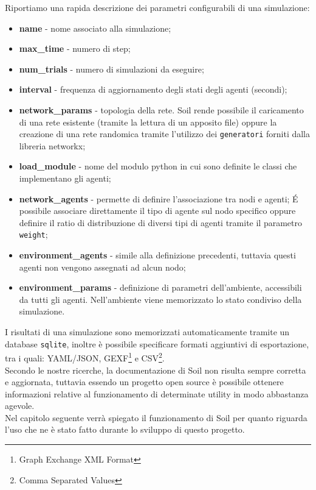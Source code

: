         Riportiamo una rapida descrizione dei parametri configurabili di una simulazione:
        
        \begin{itemize}
            \item \textbf{name} - nome associato alla simulazione;
            \item \textbf{max\_time} - numero di step;
            \item \textbf{num\_trials} - numero di simulazioni da eseguire;
            \item \textbf{interval} - frequenza di aggiornamento degli stati degli agenti (secondi);
            \item \textbf{network\_params} - topologia della rete. Soil rende possibile il caricamento di una rete esistente (tramite la lettura di un apposito file) oppure la creazione di una rete randomica tramite l'utilizzo dei \texttt{generatori} forniti dalla libreria networkx;
            \item \textbf{load\_module} - nome del modulo python in cui sono definite le classi che implementano gli agenti;
            \item \textbf{network\_agents} - permette di definire l'associazione tra nodi e agenti; \'E possibile associare direttamente il tipo di agente sul nodo specifico oppure definire il ratio di distribuzione di diversi tipi di agenti tramite il parametro \texttt{weight};
            \item \textbf{environment\_agents} - simile alla definizione precedenti, tuttavia questi agenti non vengono assegnati ad alcun nodo;
            \item \textbf{environment\_params} - definizione di parametri dell'ambiente, accessibili da tutti gli agenti. Nell'ambiente viene memorizzato lo stato condiviso della simulazione.
        \end{itemize}
    
        I risultati di una simulazione sono memorizzati automaticamente tramite un database \texttt{sqlite}, inoltre è possibile specificare formati aggiuntivi di esportazione, tra i quali: YAML/JSON, GEXF\footnote{Graph Exchange XML Format} e CSV\footnote{Comma Separated Values}.\\
    
    
    Secondo le nostre ricerche, la documentazione di Soil non risulta sempre corretta e aggiornata, tuttavia essendo un progetto open source è possibile ottenere informazioni relative al funzionamento di determinate utility in modo abbastanza agevole.\\
    
    
    Nel capitolo seguente verrà spiegato il funzionamento di Soil per quanto riguarda l’uso che ne è stato fatto durante lo sviluppo di questo progetto.